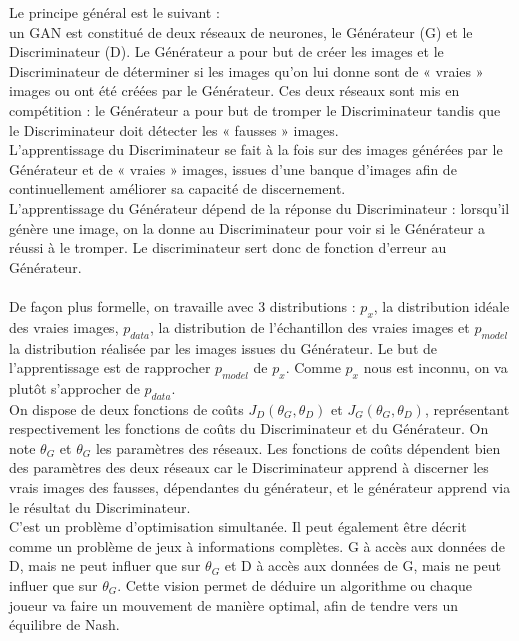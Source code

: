 		Le principe général est le suivant : \\ un GAN est constitué de deux réseaux de neurones, le Générateur (G) et le Discriminateur (D). Le Générateur a pour but de créer les images et le Discriminateur de déterminer si les images qu’on lui donne sont de « vraies » images ou ont été créées par le Générateur. Ces deux réseaux sont mis en compétition : le Générateur a pour but de tromper le Discriminateur tandis que le Discriminateur doit détecter les « fausses » images.\\
		L’apprentissage du Discriminateur se fait à la fois sur des images générées par le Générateur et de « vraies » images, issues d’une banque d’images afin de continuellement améliorer sa capacité de discernement.\\
		L’apprentissage du Générateur dépend de la réponse du  Discriminateur : lorsqu’il génère une image, on la donne au Discriminateur pour voir si le Générateur a réussi à le tromper. Le discriminateur sert donc de fonction d'erreur au Générateur.

	\paragraph{}
		De façon plus formelle, on travaille avec 3 distributions : $p_x$, la distribution idéale des vraies images, $p_{data}$, la distribution de l'échantillon des vraies images et $p_{model}$ la distribution réalisée par les images issues du Générateur. Le but de l’apprentissage est de rapprocher $p_{model}$ de $p_x$. Comme $p_x$ nous est inconnu, on va plutôt s'approcher de $p_{data}$.\\
		On dispose de deux fonctions de coûts $J_D(\theta_G, \theta_D)$ et $J_G(\theta_G, \theta_D)$, représentant respectivement les fonctions de coûts du Discriminateur et du Générateur. On note $\theta_G$ et $\theta_G$ les paramètres des réseaux. Les fonctions de coûts dépendent bien des paramètres des deux réseaux car le Discriminateur apprend à discerner les vrais images des fausses, dépendantes du générateur, et le générateur apprend via le résultat du Discriminateur.\\ C'est un problème d'optimisation simultanée. 
		Il peut également être décrit comme un problème de jeux à informations complètes. G à accès aux données de D, mais ne peut influer que sur $\theta_G$ et D à accès aux données de G, mais ne peut influer que sur $\theta_G$. Cette vision permet de déduire un algorithme ou chaque joueur va faire un mouvement de manière optimal, afin de tendre vers un équilibre de Nash.

